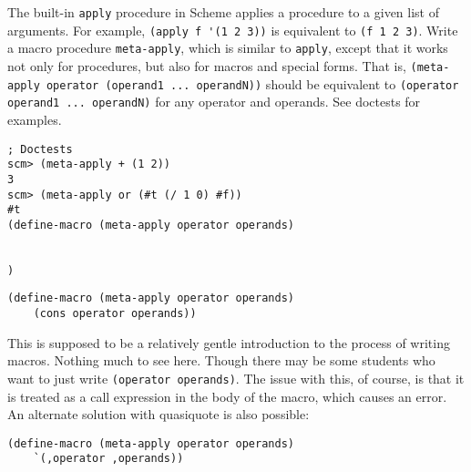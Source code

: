 \begin{blocksection}
\question The built-in \lstinline{apply} procedure in Scheme applies a procedure to a given list of arguments. For example, \lstinline{(apply f '(1 2 3))} is equivalent to \lstinline{(f 1 2 3)}. Write a macro procedure \lstinline{meta-apply}, which is similar to \lstinline{apply}, except that it works not only for procedures, but also for macros and special forms. That is, \lstinline{(meta-apply operator (operand1 ... operandN))} should be equivalent to \lstinline{(operator operand1 ... operandN)} for any operator and operands. See doctests for examples. 

\begin{lstlisting}
; Doctests
scm> (meta-apply + (1 2)) 
3
scm> (meta-apply or (#t (/ 1 0) #f))
#t
(define-macro (meta-apply operator operands)
    

)
\end{lstlisting}

\begin{solution}
\begin{lstlisting}
(define-macro (meta-apply operator operands)
    (cons operator operands))
\end{lstlisting}
\end{solution}
\end{blocksection}

\begin{questionmeta}
This is supposed to be a relatively gentle introduction to the process of writing macros. Nothing much to see here. Though there may be some students who want to just write \lstinline{(operator operands)}. The issue with this, of course, is that it is treated as a call expression in the body of the macro, which causes an error. An alternate solution with quasiquote is also possible: 
\begin{lstlisting}
(define-macro (meta-apply operator operands)
    `(,operator ,operands))
\end{lstlisting}
\end{questionmeta}